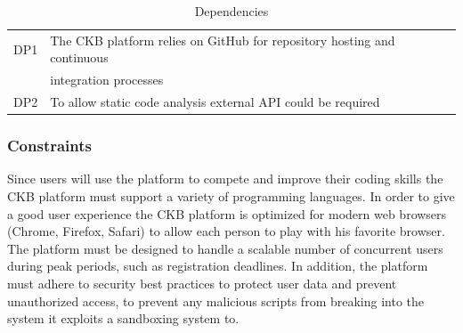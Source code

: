 \begin{table}[h]
    \centering
    \begin{tabular}{|l|l|}
    \hline
        DP1 & The CKB platform relies on GitHub for repository hosting and continuous\\
        &integration processes\\
    \hline
        DP2 & To allow static code analysis external API could be required\\
    \hline
    \end{tabular}
    \caption{Dependencies}
    \label{tab:assumptions}
\end{table}


\subsubsection{Constraints}
Since users will use the platform to compete and improve their coding skills the CKB platform must support a variety of programming languages.
In order to give a good user experience the CKB platform is optimized for modern web browsers (Chrome, Firefox, Safari) to allow each person to play with his favorite browser.
The platform must be designed to handle a scalable number of concurrent users during peak periods, such as registration deadlines. In addition, the platform must adhere to security best practices to protect user data and prevent unauthorized access, to prevent any malicious scripts from breaking into the system it exploits a sandboxing system to.